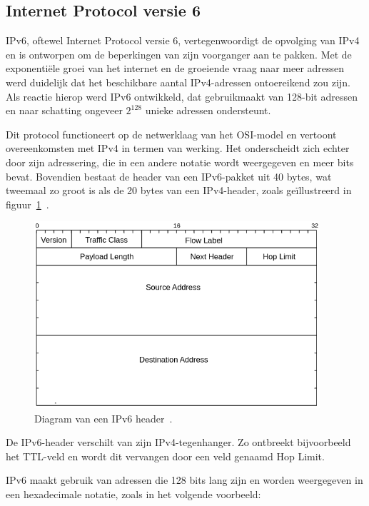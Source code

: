 \subsection{Internet Protocol versie 6}
\label{netwerk_ipv6}

IPv6, oftewel Internet Protocol versie 6, vertegenwoordigt de opvolging van IPv4 en is ontworpen om de beperkingen van zijn voorganger aan te pakken.
Met de exponenti\"ele groei van het internet en de groeiende vraag naar meer adressen werd duidelijk dat het beschikbare aantal IPv4-adressen ontoereikend zou zijn.
Als reactie hierop werd IPv6 ontwikkeld, dat gebruikmaakt van 128-bit adressen en naar schatting ongeveer \(2^{128}\) unieke adressen ondersteunt.

Dit protocol functioneert op de netwerklaag van het OSI-model en vertoont overeenkomsten met IPv4 in termen van werking.
Het onderscheidt zich echter door zijn adressering, die in een andere notatie wordt weergegeven en meer bits bevat.
Bovendien bestaat de header van een IPv6-pakket uit 40 bytes, wat tweemaal zo groot is als de 20 bytes van een IPv4-header, zoals geïllustreerd in figuur~\ref{fig:network-ipv6-header}~\autocite{dordal2020}.

\begin{figure}[h!]
    \begin{center}
        \includegraphics[width=300pt]
        {./graphics/network/ipv6-header.png}
        \caption[IPv6 header diagram.]{\label{fig:network-ipv6-header}Diagram van een IPv6 header~\autocite{dordal2020}.}
    \end{center}
\end{figure}

De IPv6-header verschilt van zijn IPv4-tegenhanger. Zo ontbreekt bijvoorbeeld het TTL-veld en wordt dit vervangen door een veld genaamd Hop Limit.

IPv6 maakt gebruik van adressen die 128 bits lang zijn en worden weergegeven in een hexadecimale notatie, zoals in het volgende voorbeeld:

